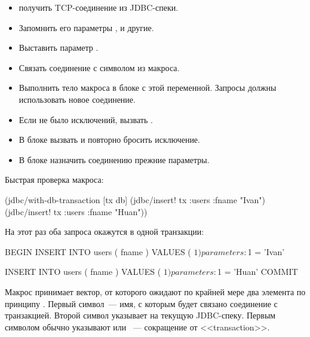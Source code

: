 \begin{itemize}

\item
  получить TCP-соединение из JDBC-спеки.

\item
  Запомнить его параметры ,  и другие.

\item
  Выставить параметр .

\item
  Связать соединение с символом из макроса.

\item
  Выполнить тело макроса в блоке  с этой переменной. Запросы должны использовать новое соединение.

\item
  Если не было исключений, вызвать .

\item
  В блоке  вызвать  и повторно бросить исключение.

\item
  В блоке  назначить соединению прежние параметры.

\end{itemize}

Быстрая проверка макроса:

\begin{english}
  \begin{clojure}
(jdbc/with-db-transaction [tx db]
  (jdbc/insert! tx :users {:fname "Ivan"})
  (jdbc/insert! tx :users {:fname "Huan"}))
  \end{clojure}
\end{english}

На этот раз оба запроса окажутся в одной транзакции:

\begin{english}
  \begin{sql}
BEGIN
INSERT INTO users ( fname ) VALUES ( $1 )
parameters: $1 = 'Ivan'

INSERT INTO users ( fname ) VALUES ( $1 )
parameters: $1 = 'Huan'
COMMIT
  \end{sql}
\end{english}

Макрос принимает вектор, от которого ожидают по крайней мере два элемента по принципу . Первый символ~--- имя, с которым будет связано соединение с транзакцией. Второй символ указывает на текущую JDBC-спеку. Первым символом обычно указывают  или ~--- сокращение от <<transaction>>.

